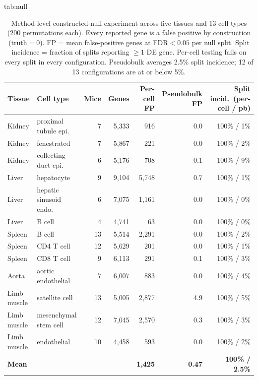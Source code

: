 \documentclass[pmlr,twocolumn,10pt]{jmlr}
\begin{document}
\begin{table}[htbp]
\floatconts
  {tab:null}
  {\caption{Method-level constructed-null experiment across five tissues and 13
  cell types (200 permutations each). Every reported gene is a false positive by
  construction (truth${=}0$). FP = mean false-positive genes at FDR${<}0.05$ per
  null split. Split incidence = fraction of splits reporting ${\geq}1$ DE gene.
  Per-cell testing fails on every split in every configuration. Pseudobulk
  averages 2.5\% split incidence; 12 of 13 configurations are at or below
  5\%.}}
  {\footnotesize
  \begin{tabular}{llrrrrr}
  \toprule
  \textbf{Tissue} & \textbf{Cell type} & \textbf{Mice} & \textbf{Genes} &
  \textbf{Per-cell FP} & \textbf{Pseudobulk FP} & \textbf{Split incid.\ (per-cell / pb)} \\
  \midrule
  Kidney      & proximal tubule epi.        & 7  & 5{,}333 & 916   & 0.0 & 100\% / 1\% \\
  Kidney      & fenestrated                 & 7  & 5{,}867 & 221   & 0.0 & 100\% / 2\% \\
  Kidney      & collecting duct epi.        & 6  & 5{,}176 & 708   & 0.1 & 100\% / 9\% \\
  Liver       & hepatocyte                  & 9  & 9{,}104 & 5{,}748 & 0.7 & 100\% / 1\% \\
  Liver       & hepatic sinusoid endo.      & 6  & 7{,}075 & 1{,}161 & 0.0 & 100\% / 0\% \\
  Liver       & B cell                      & 4  & 4{,}741 & 63    & 0.0 & 100\% / 0\% \\
  Spleen      & B cell                      & 13 & 5{,}514 & 2{,}291 & 0.0 & 100\% / 2\% \\
  Spleen      & CD4 T cell                  & 12 & 5{,}629 & 201   & 0.0 & 100\% / 1\% \\
  Spleen      & CD8 T cell                  & 9  & 6{,}113 & 291   & 0.1 & 100\% / 3\% \\
  Aorta       & aortic endothelial          & 7  & 6{,}007 & 883   & 0.0 & 100\% / 4\% \\
  Limb muscle & satellite cell              & 13 & 5{,}005 & 2{,}877 & 4.9 & 100\% / 5\% \\
  Limb muscle & mesenchymal stem cell       & 12 & 7{,}045 & 2{,}570 & 0.3 & 100\% / 3\% \\
  Limb muscle & endothelial                 & 10 & 4{,}458 & 593   & 0.0 & 100\% / 2\% \\
  \midrule
  \multicolumn{4}{l}{\textbf{Mean}} & \textbf{1{,}425} & \textbf{0.47} & \textbf{100\% / 2.5\%} \\
  \bottomrule
  \end{tabular}}
\end{table}
\end{document}
